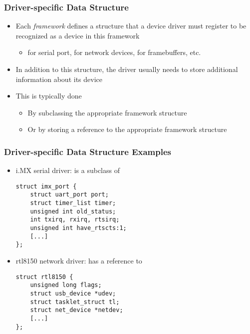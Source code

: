\begin{frame}
  \frametitle{Driver-specific Data Structure}
  \begin{itemize}
  \item Each \emph{framework} defines a structure that a device driver
    must register to be recognized as a device in this framework
    \begin{itemize}
    \item {} for serial port,  for network
      devices,  for framebuffers, etc.
    \end{itemize}
  \item In addition to this structure, the driver usually needs to
    store additional information about its device
  \item This is typically done
    \begin{itemize}
    \item By subclassing the appropriate framework structure
    \item Or by storing a reference to the appropriate framework
      structure
    \end{itemize}
  \end{itemize}
\end{frame}

\begin{frame}[fragile]
  \frametitle{Driver-specific Data Structure Examples}
  \begin{itemize}
  \item i.MX serial driver:  is a subclass of
  \begin{verbatim}
struct imx_port {
    struct uart_port port;
    struct timer_list timer;
    unsigned int old_status;
    int txirq, rxirq, rtsirq;
    unsigned int have_rtscts:1;
    [...]
};
  \end{verbatim}
  \item rtl8150 network driver:  has a reference to
  \begin{verbatim}
struct rtl8150 {
    unsigned long flags;
    struct usb_device *udev;
    struct tasklet_struct tl;
    struct net_device *netdev;
    [...]
};
  \end{verbatim}
  \end{itemize}
\end{frame}

